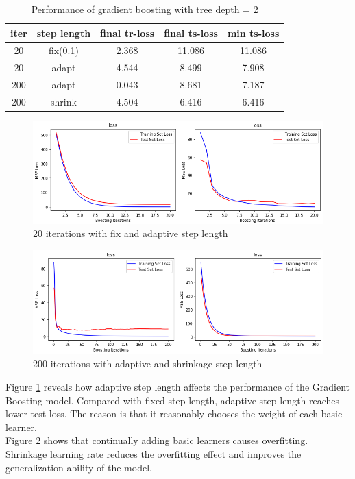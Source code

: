 \documentclass[10pt,twocolumn,letterpaper]{article}
\begin{document}
\begin{table}[ht]
\centering
\caption{Performance of gradient boosting with tree depth = 2}
 \begin{tabular}{||c c c c c||} 
 \hline
iter & step length & final tr-loss & final ts-loss & min ts-loss \\ 
 \hline\hline
20   & fix(0.1) & 2.368 & 11.086 & 11.086  \\ 
 \hline\hline
20   & adapt & 4.544 & 8.499 & 7.908 \\ 
\hline\hline
200  & adapt & 0.043 & 8.681 & 7.187 \\ 
\hline\hline
200  & shrink & 4.504 & 6.416 & 6.416\\ 
 \hline\hline
\end{tabular}
\label{table:d2gbloss}
\end{table}

\begin{figure}[h!]
  \includegraphics[width=\linewidth]{fixsl20.png}
  \caption{20 iterations with fix and adaptive step length}
  \label{fig:gb1}
\end{figure}
\begin{figure}[h!]
  \includegraphics[width=\linewidth]{adaptsl200.png}
  \caption{200 iterations with adaptive and shrinkage step length}
  \label{fig:gb2}
\end{figure}
Figure \ref{fig:gb1} reveals how adaptive step length affects the performance of the Gradient Boosting model. Compared with fixed step length, adaptive step length reaches lower test loss. The reason is that it reasonably chooses the weight of each basic learner.\\
Figure \ref{fig:gb2} shows that continually adding basic learners causes overfitting. Shrinkage learning rate reduces the overfitting effect and improves the generalization ability of the model.\\
\end{document}
